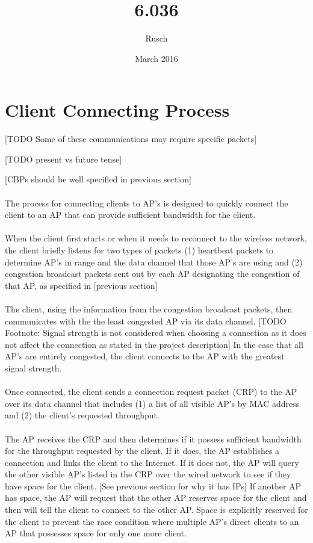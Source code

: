 \documentclass{article}
\title{6.036}
\author{Rusch}
\date{March 2016}
\begin{document}
\section{Client Connecting Process}

[TODO Some of these communications may require specific packets]

[TODO present vs future tense]

[CBPs should be well specified in previous section]
\\
\\
\indent
The process for connecting clients to AP's is designed to quickly connect the client to an AP that can provide sufficient bandwidth for the client. 
\\
\\
\indent
When the client first starts or when it needs to reconnect to the wireless network, the client briefly listens for two types of packets (1) heartbeat packets to determine AP's in range and the data channel that those AP's are using and (2) congestion broadcast packets sent out by each AP designating the congestion of that AP, as specified in [previous section]
\\
\\
\indent
The client, using the information from the congestion broadcast packets, then communicates with the the least congested AP via its data channel. [TODO Footnote: Signal strength is not considered when choosing a connection as it does not affect the connection as stated in the project description] In the case that all AP's are entirely congested, the client connects to the AP with the greatest signal strength.
\\
\\
\indent
Once connected, the client sends a connection request packet (CRP) to the AP over its data channel that includes (1) a list of all visible AP's by MAC address and (2) the client's requested throughput. 
\\
\\
\indent
The AP receives the CRP and then determines if it possess sufficient bandwidth for the throughput requested by the client. If it does, the AP establishes a connection and links the client to the Internet. If it does not, the AP will query the other visible AP's listed in the CRP over the wired network to see if they have space for the client. [See previous section for why it has IPs] If another AP has space, the AP will request that the other AP reserves space for the client and then will tell the client to connect to the other AP. Space is explicitly reserved for the client to prevent the race condition where multiple AP's direct clients to an AP that possesses space for only one more client. 
\end{document}
